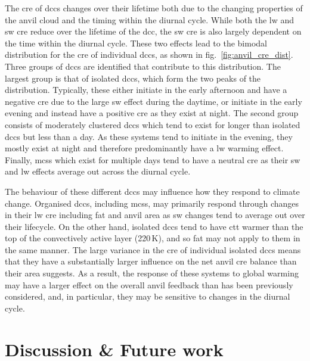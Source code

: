 The \acrshort{cre} of \acrshort{dcc}s changes over their lifetime both due to the changing properties of the anvil cloud and the timing within the diurnal cycle.
While both the \acrshort{lw} and \acrshort{sw} \acrshort{cre} reduce over the lifetime of the \acrshort{dcc}, the \acrshort{sw} \acrshort{cre} is also largely dependent on the time within the diurnal cycle.
These two effects lead to the bimodal distribution for the \acrshort{cre} of individual \acrshort{dcc}s, as shown in fig.~\ref{fig:anvil_cre_dist}.
Three groups of \acrshort{dcc}s are identified that contribute to this distribution.
The largest group is that of isolated \acrshort{dcc}s, which form the two peaks of the distribution.
Typically, these either initiate in the early afternoon and have a negative \acrshort{cre} due to the large \acrshort{sw} effect during the daytime, or initiate in the early evening and instead have a positive \acrshort{cre} as they exist at night.
The second group consists of moderately clustered \acrshort{dcc}s which tend to exist for longer than isolated \acrshort{dcc}s but less than a day.
As these systems tend to initiate in the evening, they mostly exist at night and therefore predominantly have a \acrshort{lw} warming effect.
Finally, \acrshort{mcs}s which exist for multiple days tend to have a neutral \acrshort{cre} as their \acrshort{sw} and \acrshort{lw} effects average out across the diurnal cycle.

The behaviour of these different \acrshort{dcc}s may influence how they respond to climate change.
Organised \acrshort{dcc}s, including \acrshort{mcs}s, may primarily respond through changes in their \acrshort{lw} \acrshort{cre} including \acrshort{fat} and anvil area as \acrshort{sw} changes tend to average out over their lifecycle.
On the other hand, isolated \acrshort{dcc}s tend to have \acrshort{ctt} warmer than the top of the convectively active layer (220\,\unit{K}), and so \acrshort{fat} may not apply to them in the same manner.
The large variance in the \acrshort{cre} of individual isolated \acrshort{dcc}s means that they have a substantially larger influence on the net anvil \acrshort{cre} balance than their area suggests.
As a result, the response of these systems to global warming may have a larger effect on the overall anvil feedback than has been previously considered, and, in particular, they may be sensitive to changes in the diurnal cycle.


\section{Discussion \& Future work}

